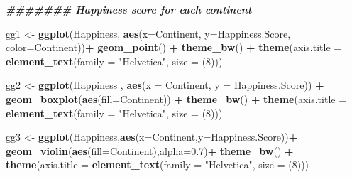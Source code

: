 \documentclass[
]{article}
\newenvironment{Shaded}{\begin{snugshade}}{\end{snugshade}}
\newcommand{\AttributeTok}[1]{\textcolor[rgb]{0.13,0.29,0.53}{#1}}
\newcommand{\DecValTok}[1]{\textcolor[rgb]{0.00,0.00,0.81}{#1}}
\newcommand{\DocumentationTok}[1]{\textcolor[rgb]{0.56,0.35,0.01}{\textbf{\textit{#1}}}}
\newcommand{\FloatTok}[1]{\textcolor[rgb]{0.00,0.00,0.81}{#1}}
\newcommand{\FunctionTok}[1]{\textcolor[rgb]{0.13,0.29,0.53}{\textbf{#1}}}
\newcommand{\NormalTok}[1]{#1}
\newcommand{\OtherTok}[1]{\textcolor[rgb]{0.56,0.35,0.01}{#1}}
\newcommand{\SpecialCharTok}[1]{\textcolor[rgb]{0.81,0.36,0.00}{\textbf{#1}}}
\newcommand{\StringTok}[1]{\textcolor[rgb]{0.31,0.60,0.02}{#1}}
\begin{document}
\begin{Shaded}
\begin{Highlighting}[]
\DocumentationTok{\#\#\#\#\#\#\# Happiness score for each continent}

\NormalTok{gg1 }\OtherTok{\textless{}{-}} \FunctionTok{ggplot}\NormalTok{(Happiness,}
              \FunctionTok{aes}\NormalTok{(}\AttributeTok{x=}\NormalTok{Continent,}
                  \AttributeTok{y=}\NormalTok{Happiness.Score,}
                  \AttributeTok{color=}\NormalTok{Continent))}\SpecialCharTok{+}
  \FunctionTok{geom\_point}\NormalTok{() }\SpecialCharTok{+} \FunctionTok{theme\_bw}\NormalTok{() }\SpecialCharTok{+}
  \FunctionTok{theme}\NormalTok{(}\AttributeTok{axis.title =} \FunctionTok{element\_text}\NormalTok{(}\AttributeTok{family =} \StringTok{"Helvetica"}\NormalTok{, }\AttributeTok{size =}\NormalTok{ (}\DecValTok{8}\NormalTok{)))}

\NormalTok{gg2 }\OtherTok{\textless{}{-}} \FunctionTok{ggplot}\NormalTok{(Happiness , }\FunctionTok{aes}\NormalTok{(}\AttributeTok{x =}\NormalTok{ Continent, }\AttributeTok{y =}\NormalTok{ Happiness.Score)) }\SpecialCharTok{+}
  \FunctionTok{geom\_boxplot}\NormalTok{(}\FunctionTok{aes}\NormalTok{(}\AttributeTok{fill=}\NormalTok{Continent)) }\SpecialCharTok{+} \FunctionTok{theme\_bw}\NormalTok{() }\SpecialCharTok{+}
  \FunctionTok{theme}\NormalTok{(}\AttributeTok{axis.title =} \FunctionTok{element\_text}\NormalTok{(}\AttributeTok{family =} \StringTok{"Helvetica"}\NormalTok{, }\AttributeTok{size =}\NormalTok{ (}\DecValTok{8}\NormalTok{)))}

\NormalTok{gg3 }\OtherTok{\textless{}{-}} \FunctionTok{ggplot}\NormalTok{(Happiness,}\FunctionTok{aes}\NormalTok{(}\AttributeTok{x=}\NormalTok{Continent,}\AttributeTok{y=}\NormalTok{Happiness.Score))}\SpecialCharTok{+}
  \FunctionTok{geom\_violin}\NormalTok{(}\FunctionTok{aes}\NormalTok{(}\AttributeTok{fill=}\NormalTok{Continent),}\AttributeTok{alpha=}\FloatTok{0.7}\NormalTok{)}\SpecialCharTok{+} \FunctionTok{theme\_bw}\NormalTok{() }\SpecialCharTok{+}
  \FunctionTok{theme}\NormalTok{(}\AttributeTok{axis.title =} \FunctionTok{element\_text}\NormalTok{(}\AttributeTok{family =} \StringTok{"Helvetica"}\NormalTok{, }\AttributeTok{size =}\NormalTok{ (}\DecValTok{8}\NormalTok{)))}


\end{Highlighting}
\end{Shaded}
\end{document}
